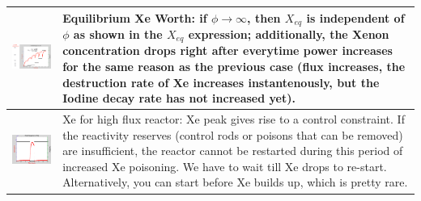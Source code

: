 \documentclass{school-22.211-notes}
\begin{document}
\begin{enumerate}
\begin{table}
\begin{tabular}{|p{}|p{}|}
%
    \begin{minipage}[b]{0.6\textwidth}
      \includegraphics[width=3.5in]{images/dfs/I-Xe-3.png}
    \end{minipage}
 &  
    \begin{minipage}[b]{0.4\textwidth}    
      Equilibrium Xe Worth: if $\phi \to \infty$, then $X_{eq}$ is independent of $\phi$ as shown in the $X_{eq}$ expression; additionally, the Xenon concentration drops right after everytime power increases for the same reason as the previous case (flux increases, the destruction rate of Xe increases instantenously, but the Iodine decay rate has not increased yet). 
    \end{minipage} \\ \hline
%
    \begin{minipage}[b]{0.6\textwidth}
    \includegraphics[width=3.5in]{images/dfs/I-Xe-4.png}
    \end{minipage}
 &  
    \begin{minipage}[b]{0.4\textwidth}
      Xe for high flux reactor: Xe peak gives rise to a control constraint. If the reactivity reserves (control rods or poisons that can be removed) are insufficient, the reactor cannot be restarted during this period of increased Xe poisoning. We have to wait till Xe drops to re-start. Alternatively, you can start before Xe builds up, which is pretty rare. 
      \end{minipage} \\ \hline
  \end{tabular}
\end{table}



\end{enumerate}
\end{document}

